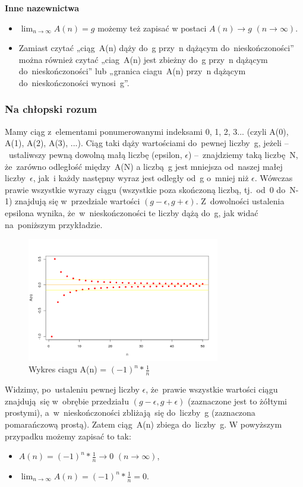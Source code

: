 \noindent
\textbf{Inne nazewnictwa}
\begin{itemize}
    \item $\lim_{n \to \infty} A(n) = g$ możemy też zapisać w postaci \newline $A(n) \to g$ $(n \to \infty)$.
    \item Zamiast czytać „ciąg~A(n) dąży do~g przy~n dążącym do~nieskończoności” można również czytać „ciag~A(n) jest zbieżny do~g przy~n dążącym do~nieskończoności” lub „granica ciagu~A(n) przy~n dążącym do~nieskończoności wynosi~g”.
\end{itemize}
\indent

\subsubsection{Na chłopski rozum}
Mamy ciąg z~elementami ponumerowanymi indeksami 0, 1, 2, 3... (czyli A(0), A(1), A(2), A(3), ...). Ciąg taki dąży wartościami do~pewnej liczby~g, jeżeli –~ustaliwszy pewną dowolną małą liczbę (epsilon, $\epsilon$) –~znajdziemy taką liczbę~N, że~zarówno odległość między~A(N) a liczbą~g jest mniejsza od~naszej małej liczby~$\epsilon$, 
jak~i każdy następny wyraz jest odległy od~g o~mniej niż $\epsilon$. Wówczas prawie wszystkie wyrazy ciągu (wszystkie poza skończoną liczbą, tj.~od~0 do~N-1) znajdują się w~przedziale wartości $(g-\epsilon, g+\epsilon)$. 
Z~dowolności ustalenia epsilona wynika, że~w~nieskończoności te liczby dążą do~g, jak widać na~poniższym przykładzie.
\begin{figure}[H]
    \caption{Wykres ciagu A(n) = $(-1)^n * \frac{1}{n}$}
    \centering
        \includegraphics[width=0.75\textwidth]{photos/granica1.png}
\end{figure}
Widzimy, po~ustaleniu pewnej liczby $\epsilon$, że~prawie wszystkie wartości ciągu znajdują~się w~obrębie przedziału $(g-\epsilon, g+\epsilon)$ (zaznaczone jest to żółtymi prostymi), a~w~nieskończoności zbliżają~się do~liczby~g (zaznaczona pomarańczową prostą). Zatem ciąg~A(n) zbiega do~liczby~g.
W powyższym przypadku możemy zapisać to tak:
\begin{itemize}
    \item $A(n) = (-1)^n * \frac{1}{n} \to 0$ $(n \to \infty)$,
    \item $\lim_{n \to \infty} A(n) = (-1)^n * \frac{1}{n} = 0$.
\end{itemize} 


